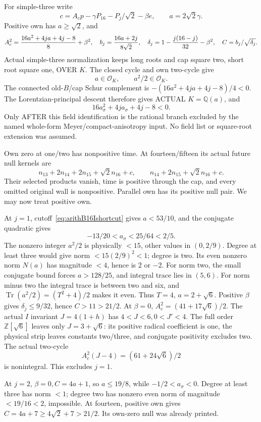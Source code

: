 \documentclass[11pt]{article}
\begin{document}
For simple-three write
\[
 c=A_cp-\gamma P_{16}-P_j/\sqrt2-\beta e,\qquad a=2\sqrt2\gamma .
\]
Positive own has \(a\ge\sqrt2\), and
\[
 A_c^2={16a^2+4ja+4j-8\over8}+\beta^2,\quad
 b_j={16a+2j\over8\sqrt2},\quad
 \delta_j=1-{j(16-j)\over32}-\beta^2,\quad C=b_j/\sqrt{\delta_j}.
\]
Actual simple-three normalization keeps
long roots and cap square two, short
root square one, OVER \(K\).
The closed cycle and own two-cycle give
\[
                           a\in\mathcal O_K,\qquad a^2/2\in\mathcal O_K .
\]
The connected old-\(B\)/cap Schur
complement is
\(-(16a^2+4ja+4j-8)/4<0\).
The Lorentzian-principal descent therefore
gives ACTUAL \(K=\mathbb Q(a)\), and
\[
                          16a_\sigma^2+4ja_\sigma+4j-8<0 .
\]
Only AFTER this field identification is
the rational branch excluded by the
named whole-form Meyer/compact-anisotropy
input.
No field list or square-root extension
was assumed.

Own zero at one/two has nonpositive
time.
At fourteen/fifteen its actual future
null kernels are
\[
 n_{13}+2n_{14}+2n_{15}+\sqrt2n_{16}+c,\qquad
 n_{14}+2n_{15}+\sqrt2n_{16}+c .
\]
Their selected products vanish, time is
positive through the cap, and every
omitted original wall is nonpositive.
Parallel own has its positive null pair.
We may now treat positive own.

At \(j=1\), cutoff~\eqref{eq:arithB16Ishortcut}
gives \(a<53/10\), and the conjugate
quadratic gives
\[
                     -13/20<a_\sigma<25/64<2/5 .
\]
The nonzero integer \(a^2/2\) is
physically \(<15\), other values in
\((0,2/9)\).
Degree at least three would give norm
\(<15(2/9)^2<1\); degree is two.
Its even nonzero norm \(N(a)\) has
magnitude \(<4\), hence is \(2\) or \(-2\).
For norm two, the small conjugate bound
forces \(a>128/25\), and integral trace
lies in \((5,6)\).
For norm minus two the integral trace is
between two and six, and
\(\operatorname{Tr}(a^2/2)=(T^2+4)/2\)
makes it even.
Thus \(T=4\), \(a=2+\sqrt6\).
Positive \(\beta\) gives \(\delta_j\le9/32\),
hence \(C>11>21/2\).
At \(\beta=0\), \(A_c^2=(41+17\sqrt6)/2\).
The actual \(I\) invariant
\(J=4(1+h)\) has \(4<J<6,0<J'<4\).
The full order \(\mathbb Z[\sqrt6]\)
leaves only \(J=3+\sqrt6\):
its positive radical coefficient is one,
the physical strip leaves constants
two/three, and conjugate positivity
excludes two.
The actual two-cycle
\[
                     A_c^2(J-4)=(61+24\sqrt6)/2
\]
is nonintegral.  This excludes \(j=1\).

At \(j=2\), \(\beta=0,C=4a+1\),
so \(a\le19/8\), while
\(-1/2<a_\sigma<0\).
Degree at least three has norm \(<1\);
degree two has nonzero even norm of
magnitude \(<19/16<2\), impossible.
At fourteen, positive own gives
\(C=4a+7\ge4\sqrt2+7>21/2\).
Its own-zero null was already printed.
\end{document}

